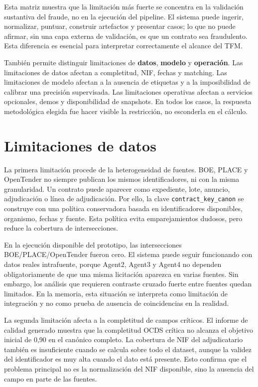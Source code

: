 \documentclass[11pt,a4paper,spanish]{book}
\numberwithin{equation}{chapter}
\numberwithin{figure}{chapter}
\begin{document}
Esta matriz muestra que la limitaci{\'o}n m{\'a}s fuerte se concentra en la validaci{\'o}n sustantiva del
fraude, no en la ejecuci{\'o}n del pipeline. El sistema puede ingerir, normalizar, puntuar, construir
artefactos y presentar casos; lo que no puede afirmar, sin una capa externa de validaci{\'o}n, es que
un contrato sea fraudulento. Esta diferencia es esencial para interpretar correctamente el alcance
del TFM.

Tambi{\'e}n permite distinguir limitaciones de \textbf{datos}, \textbf{modelo} y \textbf{operaci{\'o}n}.
Las limitaciones de datos afectan a completitud, NIF, fechas y matching. Las limitaciones de modelo
afectan a la ausencia de etiquetas y a la imposibilidad de calibrar una precisi{\'o}n supervisada. Las
limitaciones operativas afectan a servicios opcionales, demos y disponibilidad de snapshots. En todos
los casos, la respuesta metodol{\'o}gica elegida fue hacer visible la restricci{\'o}n, no esconderla en
el c{\'a}lculo.

\section{Limitaciones de datos}
\label{sec:limitaciones_datos}

La primera limitaci{\'o}n procede de la heterogeneidad de fuentes. BOE, PLACE y OpenTender no siempre
publican los mismos identificadores, ni con la misma granularidad. Un contrato puede aparecer como
expediente, lote, anuncio, adjudicaci{\'o}n o l{\'i}nea de adjudicaci{\'o}n. Por ello, la clave
\texttt{contract\_key\_canon} se construye con una pol{\'i}tica conservadora basada en identificadores
disponibles, organismo, fechas y fuente. Esta pol{\'i}tica evita emparejamientos dudosos, pero reduce
la cobertura de intersecciones.

En la ejecuci{\'o}n disponible del prototipo, las intersecciones BOE/PLACE/OpenTender fueron cero. El sistema
puede seguir funcionando con datos reales intrafuente, porque Agent2, Agent3 y Agent4 no dependen
obligatoriamente de que una misma licitaci{\'o}n aparezca en varias fuentes. Sin embargo, los an{\'a}lisis
que requieren contraste cruzado fuerte entre fuentes quedan limitados. En la memoria, esta situaci{\'o}n
se interpreta como limitaci{\'o}n de integraci{\'o}n y no como prueba de ausencia de coincidencias en la
realidad.

La segunda limitaci{\'o}n afecta a la completitud de campos cr{\'i}ticos. El informe de calidad generado
muestra que la completitud OCDS cr{\'i}tica no alcanza el objetivo inicial de 0,90 en el can{\'o}nico
completo. La cobertura de NIF del adjudicatario tambi{\'e}n es insuficiente cuando se calcula sobre
todo el dataset, aunque la validez del identificador es muy alta cuando el dato est{\'a} presente.
Esto confirma que el problema principal no es la normalizaci{\'o}n del NIF disponible, sino la
ausencia del campo en parte de las fuentes.
\end{document}
